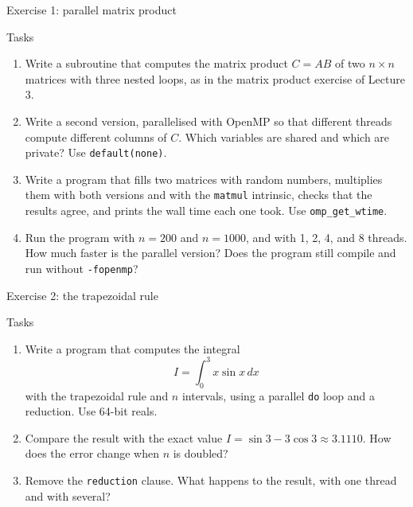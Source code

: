 \begin{frame}{Exercise 1: parallel matrix product}
  \begin{block}{Tasks}
    \begin{enumerate}
      \item Write a subroutine that computes the matrix product $C = AB$ of two $n \times n$ matrices with three nested loops, as in the matrix product exercise of Lecture 3.
      \item Write a second version, parallelised with OpenMP so that different threads compute different columns of $C$. Which variables are shared and which are private? Use \texttt{default(none)}.
      \item Write a program that fills two matrices with random numbers, multiplies them with both versions and with the \texttt{matmul} intrinsic, checks that the results agree, and prints the wall time each one took. Use \texttt{omp\_get\_wtime}.
      \item Run the program with $n = 200$ and $n = 1000$, and with 1, 2, 4, and 8 threads. How much faster is the parallel version? Does the program still compile and run without \texttt{-fopenmp}?
    \end{enumerate}
  \end{block}
\end{frame}


\begin{frame}{Exercise 2: the trapezoidal rule}
  \begin{block}{Tasks}
    \begin{enumerate}
      \item Write a program that computes the integral
        \[ I = \int_0^3 x \sin x \, dx \]
        with the trapezoidal rule and $n$ intervals, using a parallel \texttt{do} loop and a reduction. Use 64-bit reals.
      \item Compare the result with the exact value $I = \sin 3 - 3 \cos 3 \approx 3.1110$. How does the error change when $n$ is doubled?
      \item Remove the \texttt{reduction} clause. What happens to the result, with one thread and with several?
    \end{enumerate}
  \end{block}
\end{frame}


